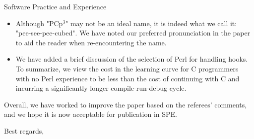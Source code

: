 \documentclass{letter}
\newcommand{\pcp}{\mbox{\textsf{PCp}$^3$}}
\begin{document}
\begin{letter}{
Software Practice and Experience}
\begin{itemize}
\item Although "\pcp" may not be an ideal name, it is indeed what we call
it: "pee-see-pee-cubed".  We have noted our preferred pronunciation in
the paper to aid the reader when re-encountering the name.

\item We have added a brief discussion of the selection of Perl for
handling hooks.  To summarize, we view the cost in the learning curve for C
programmers with no Perl experience to be less than the cost of continuing
with C and incurring a significantly longer compile-run-debug cycle.

\end{itemize}

Overall, we have worked to improve the paper based on the referees'
comments, and we hope it is now acceptable for publication in SPE.

\closing{Best regards,}
\end{letter}
\end{document}
